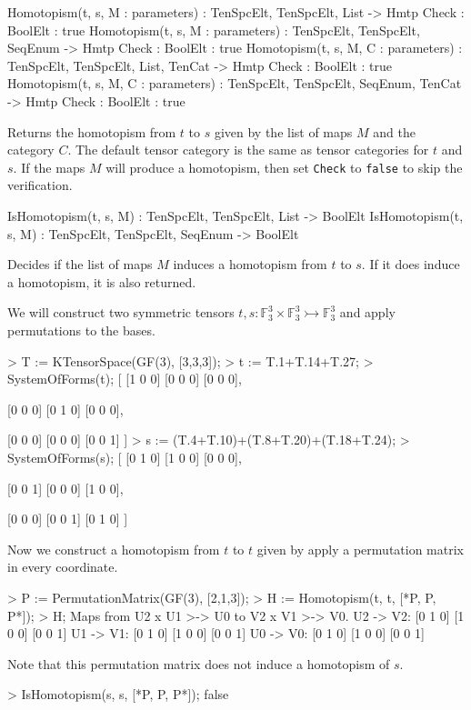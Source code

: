 \begin{intrinsics}
Homotopism(t, s, M : parameters) : TenSpcElt, TenSpcElt, List -> Hmtp
    Check : BoolElt : true
Homotopism(t, s, M : parameters) : TenSpcElt, TenSpcElt, SeqEnum -> Hmtp
    Check : BoolElt : true
Homotopism(t, s, M, C : parameters) : TenSpcElt, TenSpcElt, List, TenCat -> Hmtp
    Check : BoolElt : true
Homotopism(t, s, M, C : parameters) : TenSpcElt, TenSpcElt, SeqEnum, TenCat -> Hmtp
    Check : BoolElt : true
\end{intrinsics}

Returns the homotopism from $t$ to $s$ given by the list of maps $M$ and the category $C$. 
The default tensor category is the same as tensor categories for $t$ and $s$.
If the maps $M$ will produce a homotopism, then set \texttt{Check} to \texttt{false} to skip the verification.

\begin{intrinsics}
IsHomotopism(t, s, M) : TenSpcElt, TenSpcElt, List -> BoolElt
IsHomotopism(t, s, M) : TenSpcElt, TenSpcElt, SeqEnum -> BoolElt
\end{intrinsics}

Decides if the list of maps $M$ induces a homotopism from $t$ to $s$. 
If it does induce a homotopism, it is also returned.

\begin{example}[HomotopismConst]

We will construct two symmetric tensors $t,s:\mathbb{F}_3^3\times\mathbb{F}_3^3\rightarrowtail\mathbb{F}_3^3$ and apply permutations to the bases.
\begin{code}
> T := KTensorSpace(GF(3), [3,3,3]);
> t := T.1+T.14+T.27;
> SystemOfForms(t);
[
    [1 0 0]
    [0 0 0]
    [0 0 0],

    [0 0 0]
    [0 1 0]
    [0 0 0],

    [0 0 0]
    [0 0 0]
    [0 0 1]
]
> s := (T.4+T.10)+(T.8+T.20)+(T.18+T.24);
> SystemOfForms(s);
[
    [0 1 0]
    [1 0 0]
    [0 0 0],

    [0 0 1]
    [0 0 0]
    [1 0 0],

    [0 0 0]
    [0 0 1]
    [0 1 0]
]
\end{code}

Now we construct a homotopism from $t$ to $t$ given by apply a permutation matrix in every coordinate.
\begin{code}
> P := PermutationMatrix(GF(3), [2,1,3]);
> H := Homotopism(t, t, [*P, P, P*]);
> H;
Maps from U2 x U1 >-> U0 to V2 x V1 >-> V0.
U2 -> V2: 
[0 1 0]
[1 0 0]
[0 0 1]
U1 -> V1: 
[0 1 0]
[1 0 0]
[0 0 1]
U0 -> V0: 
[0 1 0]
[1 0 0]
[0 0 1]
\end{code}

Note that this permutation matrix does not induce a homotopism of $s$.
\begin{code}
> IsHomotopism(s, s, [*P, P, P*]);
false
\end{code}
\end{example}

